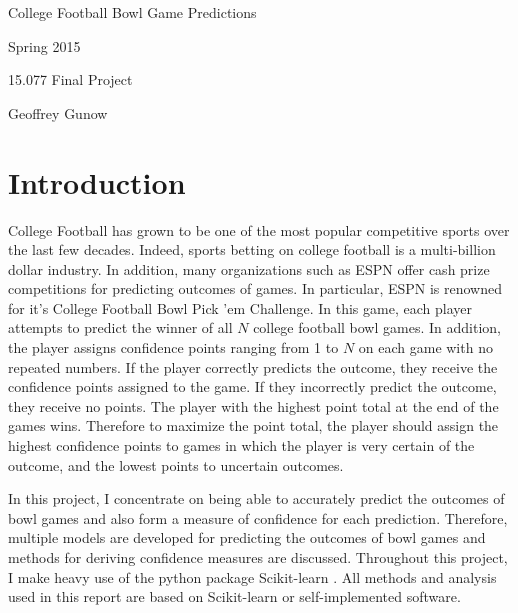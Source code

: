 \documentclass[12pt]{article}
\begin{document}
	
\noindent\centerline{\LARGE{College Football Bowl Game Predictions}}
\noindent\centerline{}
\noindent\centerline{}
\noindent\centerline{Spring 2015}
\noindent\centerline{15.077 Final Project}
\noindent\centerline{Geoffrey Gunow}

\section{Introduction}
College Football has grown to be one of the most popular competitive sports over the last few decades. Indeed, sports betting on college football is a multi-billion dollar industry. In addition, many organizations such as ESPN offer cash prize competitions for predicting outcomes of games. In particular, ESPN is renowned for it's College Football Bowl Pick 'em Challenge. In this game, each player attempts to predict the winner of all $N$ college football bowl games. In addition, the player assigns confidence points ranging from 1 to $N$ on each game with no repeated numbers. If the player correctly predicts the outcome, they receive the confidence points assigned to the game. If they incorrectly predict the outcome, they receive no points. The player with the highest point total at the end of the games wins. Therefore to maximize the point total, the player should assign the highest confidence points to games in which the player is very certain of the outcome, and the lowest points to uncertain outcomes.

In this project, I concentrate on being able to accurately predict the outcomes of bowl games and also form a measure of confidence for each prediction. Therefore, multiple models are developed for predicting the outcomes of bowl games and methods for deriving confidence measures are discussed. Throughout this project, I make heavy use of the python package Scikit-learn \cite{scikit-learn}. All methods and analysis used in this report are based on Scikit-learn or self-implemented software.
\end{document}
